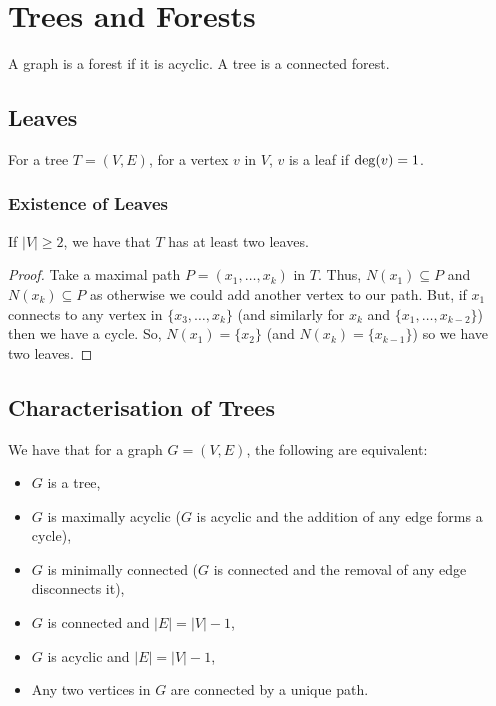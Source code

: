 \section{Trees and Forests}

A graph is a forest if it is acyclic.
A tree is a connected forest.

\subsection{Leaves}

For a tree $T = (V, E)$, for a vertex $v$ in $V$, $v$ is a leaf
if $\operatorname{deg}(v) = 1$. 

\subsubsection{Existence of Leaves}

If $|V| \geq 2$, we have that $T$ has at least two leaves.
\begin{proof}
    Take a maximal path $P = (x_1, \ldots, x_k)$ in $T$.
    Thus, $N(x_1) \subseteq P$ and $N(x_k) \subseteq P$
    as otherwise we could add another vertex to our path.
    But, if $x_1$ connects to any vertex in $\{x_3, \ldots, x_k\}$
    (and similarly for $x_k$ and $\{x_1, \ldots, x_{k - 2}\}$) then
    we have a cycle. So, $N(x_1) = \{x_2\}$ (and $N(x_k) = \{x_{k - 1}\}$)
    so we have two leaves.
\end{proof}

\subsection{Characterisation of Trees}

We have that for a graph $G = (V, E)$, the following are equivalent:
\begin{itemize}
  \item $G$ is a tree,
  \item $G$ is maximally acyclic ($G$ is acyclic and the addition
  of any edge forms a cycle),
  \item $G$ is minimally connected ($G$ is connected and the removal
  of any edge disconnects it),
  \item $G$ is connected and $|E| = |V| - 1$,
  \item $G$ is acyclic and $|E| = |V| - 1$,
  \item Any two vertices in $G$ are connected by a unique path.
\end{itemize}

